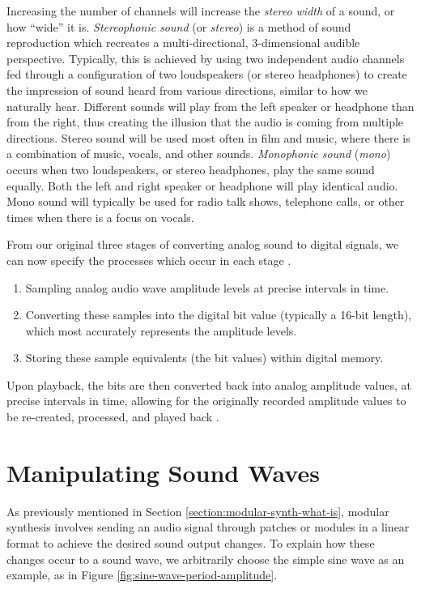 Increasing the number of channels will increase the \textit{stereo width} of a sound, or how ``wide'' it is. \textit{Stereophonic sound} (or \textit{stereo}) is a method of sound reproduction which recreates a multi-directional, 3-dimensional audible perspective. Typically, this is achieved by using two independent audio channels fed through a configuration of two loudspeakers (or stereo headphones) to create the impression of sound heard from various directions, similar to how we naturally hear. Different sounds will play from the left speaker or headphone than from the right, thus creating the illusion that the audio is coming from multiple directions. Stereo sound will be used most often in film and music, where there is a combination of music, vocals, and other sounds. \textit{Monophonic sound} (\textit{mono}) occurs when two loudspeakers, or stereo headphones, play the same sound equally. Both the left and right speaker or headphone will play identical audio. Mono sound will typically be used for radio talk shows, telephone calls, or other times when there is a focus on vocals.

From our original three stages of converting analog sound to digital signals, we can now specify the processes which occur in each stage \cite{Huber_Runstein_2018}. 

\begin{enumerate}
	\item Sampling analog audio wave amplitude levels at precise intervals in time.
	\item Converting these samples into the digital bit value (typically a 16-bit length), which most accurately represents the amplitude levels.
	\item Storing these sample equivalents (the bit values) within digital memory.
\end{enumerate}

Upon playback, the bits are then converted back into analog amplitude values, at precise intervals in time, allowing for the originally recorded amplitude values to be re-created, processed, and played back \cite{Huber_Runstein_2018}. 

\section{Manipulating Sound Waves}\label{section:manip-waves}
As previously mentioned in Section \ref{section:modular-synth-what-is}, modular synthesis involves sending an audio signal through patches or modules in a linear format to achieve the desired sound output changes. To explain how these changes occur to a sound wave, we arbitrarily choose the simple sine wave as an example, as in Figure \ref{fig:sine-wave-period-amplitude}. 

